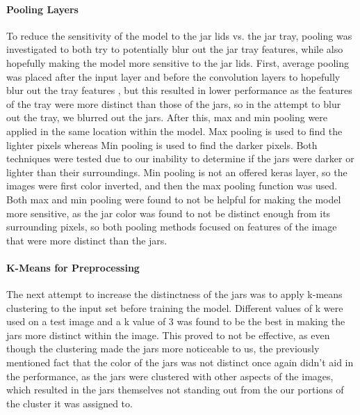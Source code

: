 \documentclass[11pt]{article}
\begin{document}
                \paragraph{Pooling Layers}
                To reduce the sensitivity of the model to the jar lids vs. the jar tray, pooling was investigated to both try to potentially blur out the jar tray features, while also hopefully making the model more sensitive to the jar lids. First, average pooling was placed after the input layer and before the convolution layers to hopefully blur out the tray features , but this resulted in lower performance as the features of the tray were more distinct than those of the jars, so in the attempt to blur out the tray, we blurred out the jars. After this, max and min pooling were applied in the same location within the model. Max pooling is used to find the lighter pixels whereas Min pooling is used to find the darker pixels. Both techniques were tested due to our inability to determine if the jars were darker or lighter than their surroundings. Min pooling is not an offered keras layer, so the images were first color inverted, and then the max pooling function was used. Both max and min pooling were found to not be helpful for making the model more sensitive, as the jar color was found to not be distinct enough from its surrounding pixels, so both pooling methods focused on features of the image that were more distinct than the jars. 
                \paragraph{K-Means for Preprocessing}
                The next attempt to increase the distinctness of the jars was to apply k-means clustering to the input set before training the model. Different values of k were used on a test image and a k value of 3 was found to be the best in making the jars more distinct within the image. This proved to not be effective, as even though the clustering made the jars more noticeable to us, the previously mentioned fact that the color of the jars was not distinct once again didn't aid in the performance, as the jars were clustered with other aspects of the images, which resulted in the jars themselves not standing out from the our portions of the cluster it was assigned to.
\end{document}
